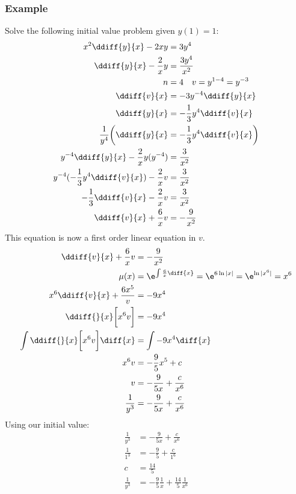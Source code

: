 \documentclass{math}
\begin{document}
\subsubsection*{Example}
Solve the following initial value problem given \( y(1) = 1 \):
\begin{align*}
  x^2\ddiff{y}{x}-2xy &= 3y^4 \\
  \ddiff{y}{x}-\frac{2}{x}y &= \frac{3y^4}{x^2} \\
  n &= 4 \quad v = y^{1-4} = y^{-3} \\
  \ddiff{v}{x} &= -3y^{-4}\ddiff{y}{x} \\
  \ddiff{y}{x} &= -\frac{1}{3}y^4\ddiff{v}{x} \\
  \frac{1}{y^4}\bigg(\ddiff{y}{x} &= -\frac{1}{3}y^4\ddiff{v}{x}\bigg) \\
  y^{-4}\ddiff{y}{x}-\frac{2}{x}y(y^{-4}) &= \frac{3}{x^2} \\
  y^{-4}(-\frac{1}{3}y^4\ddiff{v}{x})-\frac{2}{x}v &= \frac{3}{x^2} \\
  -\frac{1}{3}\ddiff{v}{x}-\frac{2}{x}v &= \frac{3}{x^2} \\
  \ddiff{v}{x}+\frac{6}{x}v &= -\frac{9}{x^2}
\end{align*}
This equation is now a first order linear equation in \( v \).
\begin{align*}
  \ddiff{v}{x}+\frac{6}{x}v &= -\frac{9}{x^2} \\
  \mu(x) &= \e^{\int\frac{6}{x}\diff{x}} = \e^{6\ln|x|} = \e^{\ln|x^6|} = x^6 \\
  x^6\ddiff{v}{x}+\frac{6x^5}v &= -9x^4 \\
  \ddiff{}{x}\bigg[x^6v\bigg] &= -9x^4 \\
  \int\ddiff{}{x}\bigg[x^6v\bigg]\diff{x} &= \int-9x^4\diff{x} \\
  x^6v &= -\frac{9}{5}x^5+c \\
  v &= -\frac{9}{5x}+\frac{c}{x^6} \\
  \frac{1}{y^3} &= -\frac{9}{5x}+\frac{c}{x^6}
\end{align*}
Using our initial value:
\begin{align*}
  \frac{1}{y^3} &= -\frac{9}{5x}+\frac{c}{x^6} \\
  \frac{1}{1^3} &= -\frac{9}{5}+\frac{c}{1^6} \\
  c &= \frac{14}{5} \\
  \frac{1}{y^3} &= -\frac{9}{5}\frac{1}{x}+\frac{14}{5}\frac{1}{x^6}
\end{align*}
\end{document}
